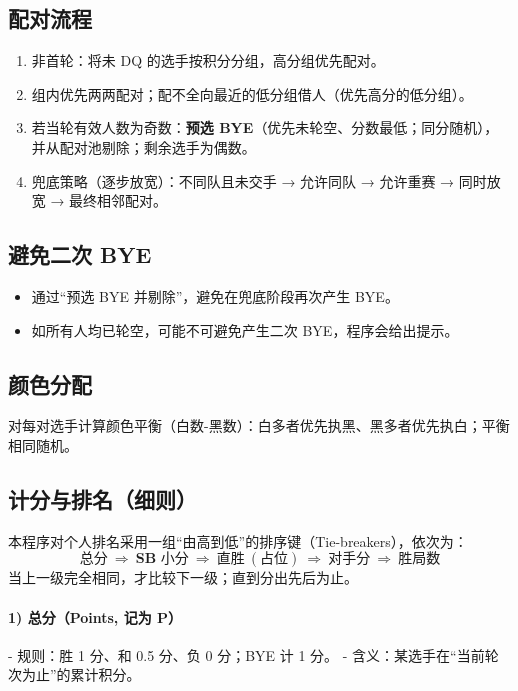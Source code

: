 \documentclass[12pt]{ctexart}
\begin{document}
\subsection{配对流程}
\begin{enumerate}[leftmargin=1.6em]
  \item 非首轮：将未 DQ 的选手按积分分组，高分组优先配对。
  \item 组内优先两两配对；配不全向最近的低分组借人（优先高分的低分组）。
  \item 若当轮有效人数为奇数：\textbf{预选 BYE}（优先未轮空、分数最低；同分随机），并从配对池剔除；剩余选手为偶数。
  \item 兜底策略（逐步放宽）：不同队且未交手 → 允许同队 → 允许重赛 → 同时放宽 → 最终相邻配对。
\end{enumerate}

\subsection{避免二次 BYE}
\begin{itemize}[leftmargin=1.6em]
  \item 通过“预选 BYE 并剔除”，避免在兜底阶段再次产生 BYE。
  \item 如所有人均已轮空，可能不可避免产生二次 BYE，程序会给出提示。
\end{itemize}

\subsection{颜色分配}
对每对选手计算颜色平衡（白数-黑数）：白多者优先执黑、黑多者优先执白；平衡相同随机。

\subsection{计分与排名（细则）}
本程序对个人排名采用一组“由高到低”的排序键（Tie-breakers），依次为：
\[\textbf{总分} \ \Rightarrow\  \textbf{SB 小分}\ \Rightarrow\ \textbf{直胜}\ (\text{占位})\ \Rightarrow\  \textbf{对手分}\ \Rightarrow\ \textbf{胜局数}\]
当上一级完全相同，才比较下一级；直到分出先后为止。

\paragraph{1) 总分（Points, 记为 P）}
- 规则：胜 1 分、和 0.5 分、负 0 分；BYE 计 1 分。  
- 含义：某选手在“当前轮次为止”的累计积分。  
\end{document}
